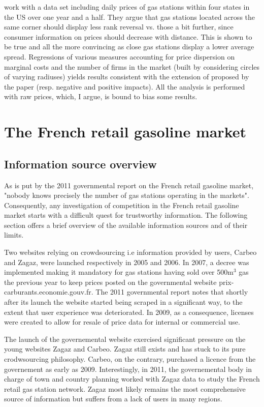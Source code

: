 \documentclass[11pt]{article}
\begin{document}
\cite{TAP11} work with a data set including daily prices of gas stations within four states in the US over one year and a half. They argue that gas stations located across the same corner should display less rank reversal vs. those a bit further, since consumer information on prices should decrease with distance. This is shown to be true and all the more convincing as close gas stations display a lower average spread. Regressions of various measures accounting for price dispersion on marginal costs and the number of firms in the market (built by considering circles of varying radiuses) yields results consistent with the extension of \cite{VAR80} proposed by the paper (resp. negative and positive impacts). All the analysis is performed with raw prices, which, I argue, is bound to bias some results.

\section{The French retail gasoline market}

\subsection{Information source overview}

As is put by the 2011 governmental report on the French retail gasoline market, "nobody knows precisely the number of gas stations operating in the markets". Consequently, any investigation of competition in the French retail gasoline market starts with a difficult quest for trustworthy information. The following section offers a brief overview of the available information sources and of their limits.

Two websites relying on crowdsourcing i.e information provided by users, Carbeo and Zagaz, were launched respectively in 2005 and 2006. In 2007, a decree was implemented making it mandatory for gas stations having sold over 500m$^{3}$ gas the previous year to keep prices posted on the governmental website prix-carburants.economie.gouv.fr. The 2011 governmental report notes that shortly after its launch the website started being scraped in a significant way, to the extent that user experience was deteriorated. In 2009, as a consequence, licenses were created to allow for resale of price data for internal or commercial use.

The launch of the governemental website exercised significant pressure on the young websites Zagaz and Carbeo. Zagaz still exists and has stuck to its pure crodwsourcing philosophy. Carbeo, on the contrary, purchased a licence from the governement as early as 2009. Interestingly, in 2011, the governemental body in charge of town and country planning worked with Zagaz data to study the French retail gas station network. Zagaz most likely remains the most comprehensive source of information but suffers from a lack of users in many regions.
\end{document}
